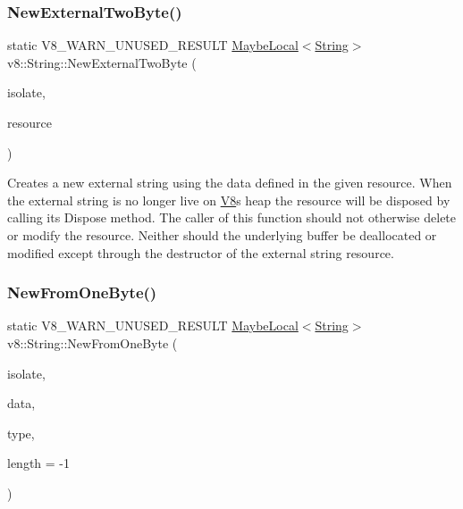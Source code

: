 \subsubsection{\texorpdfstring{New\+External\+Two\+Byte()}{NewExternalTwoByte()}}
{\footnotesize\ttfamily static V8\+\_\+\+W\+A\+R\+N\+\_\+\+U\+N\+U\+S\+E\+D\+\_\+\+R\+E\+S\+U\+LT \mbox{\hyperlink{classv8_1_1MaybeLocal}{Maybe\+Local}}$<$\mbox{\hyperlink{classv8_1_1String}{String}}$>$ v8\+::\+String\+::\+New\+External\+Two\+Byte (\begin{DoxyParamCaption}\item[{\mbox{\hyperlink{classv8_1_1Isolate}{Isolate}} $\ast$}]{isolate,  }\item[{\mbox{\hyperlink{classv8_1_1String_1_1ExternalStringResource}{External\+String\+Resource}} $\ast$}]{resource }\end{DoxyParamCaption})\hspace{0.3cm}{\ttfamily [static]}}

Creates a new external string using the data defined in the given resource. When the external string is no longer live on \mbox{\hyperlink{classv8_1_1V8}{V8}}\textquotesingle{}s heap the resource will be disposed by calling its Dispose method. The caller of this function should not otherwise delete or modify the resource. Neither should the underlying buffer be deallocated or modified except through the destructor of the external string resource. \mbox{\label{classv8_1_1String_a2b8cf518523a62d97360c07ed33d8aa6}} 
\subsubsection{\texorpdfstring{New\+From\+One\+Byte()}{NewFromOneByte()}}
{\footnotesize\ttfamily static V8\+\_\+\+W\+A\+R\+N\+\_\+\+U\+N\+U\+S\+E\+D\+\_\+\+R\+E\+S\+U\+LT \mbox{\hyperlink{classv8_1_1MaybeLocal}{Maybe\+Local}}$<$\mbox{\hyperlink{classv8_1_1String}{String}}$>$ v8\+::\+String\+::\+New\+From\+One\+Byte (\begin{DoxyParamCaption}\item[{\mbox{\hyperlink{classv8_1_1Isolate}{Isolate}} $\ast$}]{isolate,  }\item[{const uint8\+\_\+t $\ast$}]{data,  }\item[{\mbox{\hyperlink{namespacev8_ac9163ab12fb3b2a95907a3a0367c6095}{v8\+::\+New\+String\+Type}}}]{type,  }\item[{int}]{length = {\ttfamily -\/1} }\end{DoxyParamCaption})\hspace{0.3cm}{\ttfamily [static]}}

